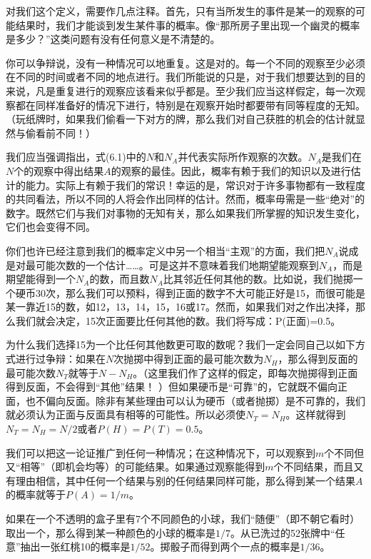 对我们这个定义，需要作几点注释。首先，只有当所发生的事件是某一的观察的可能结果时，我们才能谈到发生某件事的概率。像“那所房子里出现一个幽灵的概率是多少？”这类问题有没有任何意义是不清楚的。

你可以争辩说，没有一种情况可以地重复。这是对的。每一个不同的观察至少必须在不同的时间或者不同的地点进行。我们所能说的只是，对于我们想要达到的目的来说，凡是重复进行的观察应该看来似乎都是。至少我们应当这样假定，每一次观察都在同样准备好的情况下进行，特别是在观察开始时都要带有同等程度的无知。（玩纸牌时，如果我们偷看一下对方的牌，那么我们对自己获胜的机会的估计就显然与偷看前不同！）

我们应当强调指出，式(6.1)中的$N$和$N_A$并代表实际所作观察的次数。$N_A$是我们在$N$个的观察中得出结果$A$的观察的最佳。因此，概率有赖于我们的知识以及进行估计的能力。实际上有赖于我们的常识！幸运的是，常识对于许多事物都有一致程度的共同看法，所以不同的人将会作出同样的估计。然而，概率毋需是一些“绝对”的数字。既然它们与我们对事物的无知有关，那么如果我们所掌握的知识发生变化，它们也会变得不同。

你们也许已经注意到我们的概率定义中另一个相当“主观”的方面，我们把$N_A$说成是对最可能次数的一个估计……。可是这并不意味着我们地期望能观察到$N_A$，而是期望能得到一个$N_A$的数，而且数$N_A$比其邻近任何其他的数。比如说，我们抛掷一个硬币$30$次，那么我们可以预料，得到正面的数字不大可能正好是15，而很可能是某一靠近15的数，如12，13，14，15，16或17。然而，如果我们对之作出决择，那么我们就会决定，15次正面要比任何其他的数。我们将写成：P(正面)=0.5。

为什么我们选择15为一个比任何其他数更可取的数呢？我们一定会同自己以如下方式进行过争辩：如果在$N$次抛掷中得到正面的最可能次数为$N_H$，那么得到反面的最可能次数$N_T$就等于$N-N_H$。（这里我们作了这样的假定，即每次抛掷得到正面得到反面，不会得到“其他”结果！ ）但如果硬币是“可靠”的，它就既不偏向正面，也不偏向反面。除非有某些理由可以认为硬币（或者抛掷）是不可靠的，我们就必须认为正面与反面具有相等的可能性。所以必须使$N_T=N_H$。这样就得到$N_T=N_H=N/2$或者$P(H)=P(T)=0.5$。

我们可以把这一论证推广到任何一种情况；在这种情况下，可以观察到$m$个不同但又“相等”（即机会均等）的可能结果。如果通过观察能得到$m$个不同结果，而且又有理由相信，其中任何一个结果与别的任何结果同样可能，那么得到某一个结果$A$的概率就等于$P(A)=1/m$。

如果在一个不透明的盒子里有7个不同颜色的小球，我们“随便”（即不朝它看时）取出一个，那么得到某一种颜色的小球的概率是$1/7$。从已洗过的52张牌中“任意”抽出一张红桃10的概率是$1/52$。掷骰子而得到两个一点的概率是$1/36$。
\begin{center}
\makebox[200pt]{\hrulefill}
\end{center}

